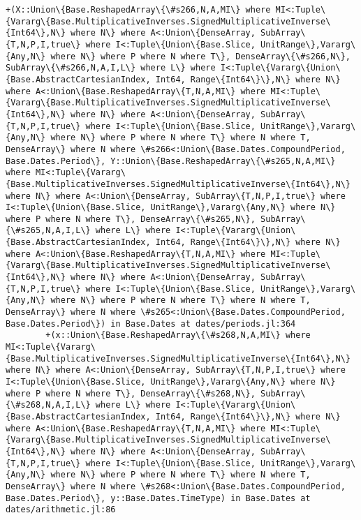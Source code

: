 \documentclass[11pt]{article}
\begin{document}
\begin{Verbatim}[commandchars=\\\{\}]
        +(X::Union\{Base.ReshapedArray\{\#s266,N,A,MI\} where MI<:Tuple\{Vararg\{Base.MultiplicativeInverses.SignedMultiplicativeInverse\{Int64\},N\} where N\} where A<:Union\{DenseArray, SubArray\{T,N,P,I,true\} where I<:Tuple\{Union\{Base.Slice, UnitRange\},Vararg\{Any,N\} where N\} where P where N where T\}, DenseArray\{\#s266,N\}, SubArray\{\#s266,N,A,I,L\} where L\} where I<:Tuple\{Vararg\{Union\{Base.AbstractCartesianIndex, Int64, Range\{Int64\}\},N\} where N\} where A<:Union\{Base.ReshapedArray\{T,N,A,MI\} where MI<:Tuple\{Vararg\{Base.MultiplicativeInverses.SignedMultiplicativeInverse\{Int64\},N\} where N\} where A<:Union\{DenseArray, SubArray\{T,N,P,I,true\} where I<:Tuple\{Union\{Base.Slice, UnitRange\},Vararg\{Any,N\} where N\} where P where N where T\} where N where T, DenseArray\} where N where \#s266<:Union\{Base.Dates.CompoundPeriod, Base.Dates.Period\}, Y::Union\{Base.ReshapedArray\{\#s265,N,A,MI\} where MI<:Tuple\{Vararg\{Base.MultiplicativeInverses.SignedMultiplicativeInverse\{Int64\},N\} where N\} where A<:Union\{DenseArray, SubArray\{T,N,P,I,true\} where I<:Tuple\{Union\{Base.Slice, UnitRange\},Vararg\{Any,N\} where N\} where P where N where T\}, DenseArray\{\#s265,N\}, SubArray\{\#s265,N,A,I,L\} where L\} where I<:Tuple\{Vararg\{Union\{Base.AbstractCartesianIndex, Int64, Range\{Int64\}\},N\} where N\} where A<:Union\{Base.ReshapedArray\{T,N,A,MI\} where MI<:Tuple\{Vararg\{Base.MultiplicativeInverses.SignedMultiplicativeInverse\{Int64\},N\} where N\} where A<:Union\{DenseArray, SubArray\{T,N,P,I,true\} where I<:Tuple\{Union\{Base.Slice, UnitRange\},Vararg\{Any,N\} where N\} where P where N where T\} where N where T, DenseArray\} where N where \#s265<:Union\{Base.Dates.CompoundPeriod, Base.Dates.Period\}) in Base.Dates at dates/periods.jl:364
        +(x::Union\{Base.ReshapedArray\{\#s268,N,A,MI\} where MI<:Tuple\{Vararg\{Base.MultiplicativeInverses.SignedMultiplicativeInverse\{Int64\},N\} where N\} where A<:Union\{DenseArray, SubArray\{T,N,P,I,true\} where I<:Tuple\{Union\{Base.Slice, UnitRange\},Vararg\{Any,N\} where N\} where P where N where T\}, DenseArray\{\#s268,N\}, SubArray\{\#s268,N,A,I,L\} where L\} where I<:Tuple\{Vararg\{Union\{Base.AbstractCartesianIndex, Int64, Range\{Int64\}\},N\} where N\} where A<:Union\{Base.ReshapedArray\{T,N,A,MI\} where MI<:Tuple\{Vararg\{Base.MultiplicativeInverses.SignedMultiplicativeInverse\{Int64\},N\} where N\} where A<:Union\{DenseArray, SubArray\{T,N,P,I,true\} where I<:Tuple\{Union\{Base.Slice, UnitRange\},Vararg\{Any,N\} where N\} where P where N where T\} where N where T, DenseArray\} where N where \#s268<:Union\{Base.Dates.CompoundPeriod, Base.Dates.Period\}, y::Base.Dates.TimeType) in Base.Dates at dates/arithmetic.jl:86

\end{Verbatim}
\end{document}
